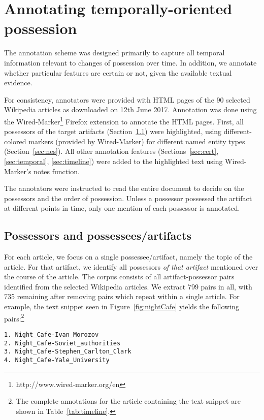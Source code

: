 \section{Annotating temporally-oriented possession}\label{sec:anno}

The annotation scheme was designed primarily to capture all temporal information relevant to changes of possession over time. 
In addition, we annotate whether particular features are certain or not, given the available textual evidence.


For consistency, annotators were provided with HTML pages of the 90 selected Wikipedia articles as downloaded on 12th June 2017. 
Annotation was done using the Wired-Marker\footnote{http://www.wired-marker.org/en} Firefox extension to annotate the HTML pages. 
First, all possessors of the target artifacts (Section~\ref{sec:possessors}) were highlighted, using different-colored markers (provided by Wired-Marker) for different named entity types (Section~\ref{sec:nes}). 
All other annotation features (Sections~\ref{sec:cert}, \ref{sec:temporal}, \ref{sec:timeline}) were added to the highlighted text using Wired-Marker's notes function.

The annotators were instructed to read the entire document to decide on the possessors and the order of possession. 
Unless a possessor possessed the artifact at different points in time, only one mention of each possessor is annotated. 



\subsection{Possessors and possessees/artifacts} \label{sec:possessors}
For each article, we focus on a single possessee/artifact, namely the topic of the article. 
For that artifact, we identify all possessors \textit{of that artifact} mentioned over the course of the article. 
The corpus consists of all artifact-possessor pairs identified from the selected Wikipedia articles. 
We extract 799 pairs in all, with 735 remaining after removing pairs which repeat within a single article. 
For example, the text snippet seen in Figure~\ref{fig:nightCafe} yields the following pairs:\footnote{The complete annotations for the article containing the text snippet are shown in Table~\ref{tab:timeline}.}

{\small
\begin{verbatim}
1. Night_Cafe-Ivan_Morozov
2. Night_Cafe-Soviet_authorities
3. Night_Cafe-Stephen_Carlton_Clark
4. Night_Cafe-Yale_University
\end{verbatim}
}


